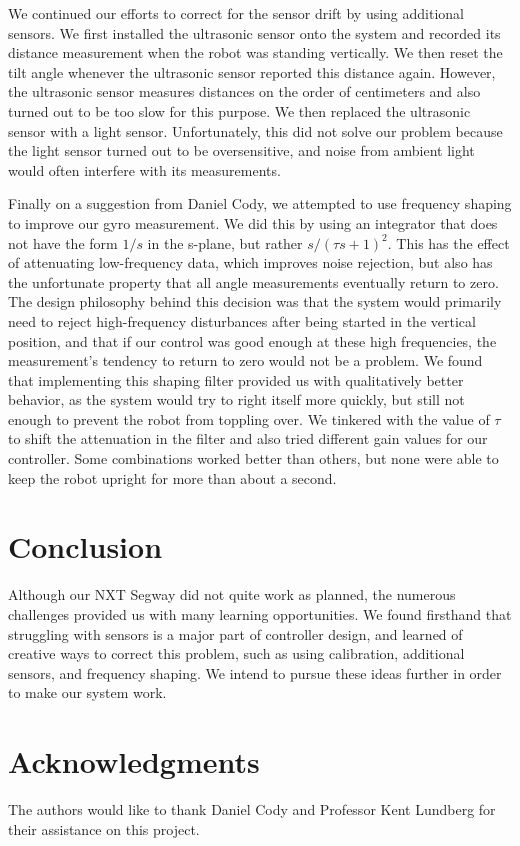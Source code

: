 \documentclass[onecolumn, draftclass]{IEEEtran} %
\begin{document}
We continued our efforts to correct for the sensor drift by using additional sensors.  We first installed the ultrasonic sensor onto the system and recorded its distance measurement when the robot was standing vertically.  We then reset the tilt angle whenever the ultrasonic sensor reported this distance again.  However, the ultrasonic sensor measures distances on the order of centimeters and also turned out to be too slow for this purpose.  We then replaced the ultrasonic sensor with a light sensor.  Unfortunately, this did not solve our problem because the light sensor turned out to be oversensitive, and noise from ambient light would often interfere with its measurements.

Finally on a suggestion from Daniel Cody, we attempted to use frequency shaping to improve our gyro measurement.  We did this by using an integrator that does not have the form $1/s$ in the s-plane, but rather $s / (\tau s + 1)^{2}$.  This has the effect of attenuating low-frequency data, which improves noise rejection, but also has the unfortunate property that all angle measurements eventually return to zero.  The design philosophy behind this decision was that the system would primarily need to reject high-frequency disturbances after being started in the vertical position, and that if our control was good enough at these high frequencies, the measurement's tendency to return to zero would not be a problem.  We found that implementing this shaping filter provided us with qualitatively better behavior, as the system would try to right itself more quickly, but still not enough to prevent the robot from toppling over.  We tinkered with the value of $\tau$ to shift the attenuation in the filter and also tried different gain values for our controller.  Some combinations worked better than others, but none were able to keep the robot upright for more than about a second.

\section{Conclusion}
Although our NXT Segway did not quite work as planned, the numerous challenges provided us with many learning opportunities.  We found firsthand that struggling with sensors is a major part of controller design, and learned of creative ways to correct this problem, such as using calibration, additional sensors, and frequency shaping.  We intend to pursue these ideas further in order to make our system work.

\section{Acknowledgments}
The authors would like to thank Daniel Cody and Professor Kent Lundberg for their assistance on this project.
\end{document}
